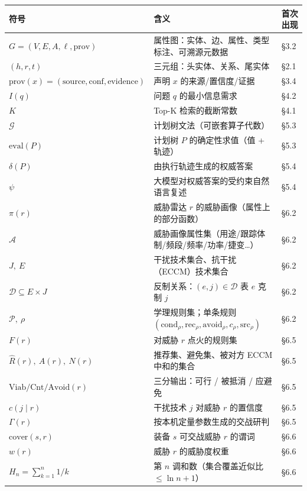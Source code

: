 \documentclass[12pt,a4paper]{ctexart}
\begin{document}
\begin{center}\small
\begin{tabular}{|p{}|p{}|p{}|}
\hline
\textbf{符号} & \textbf{含义} & \textbf{首次出现} \\ \hline
$G=(V,E,A,\ell,\mathrm{prov})$ & 属性图：实体、边、属性、类型标注、可溯源元数据 & §3.2 \\ \hline
$(h,r,t)$ & 三元组：头实体、关系、尾实体 & §2.1 \\ \hline
$\mathrm{prov}(x)=(\mathrm{source},\mathrm{conf},\mathrm{evidence})$ & 声明 $x$ 的来源/置信度/证据 & §3.4 \\ \hline
$I(q)$ & 问题 $q$ 的最小信息需求 & §4.2 \\ \hline
$K$ & Top-K 检索的截断常数 & §4.1 \\ \hline
$\mathcal{G}$ & 计划树文法（可嵌套算子代数） & §5.3 \\ \hline
$\mathrm{eval}(P)$ & 计划树 $P$ 的确定性求值（值 + 轨迹） & §5.3 \\ \hline
$\delta(P)$ & 由执行轨迹生成的权威答案 & §5.4 \\ \hline
$\psi$ & 大模型对权威答案的受约束自然语言复述 & §5.4 \\ \hline
$\pi(r)$ & 威胁雷达 $r$ 的威胁画像（属性上的部分函数） & §6.2 \\ \hline
$\mathcal{A}$ & 威胁画像属性集（用途/跟踪体制/频段/频率/功率/捷变…） & §6.2 \\ \hline
$J,\ E$ & 干扰技术集合、抗干扰（ECCM）技术集合 & §6.2 \\ \hline
$\mathcal{D}\subseteq E\times J$ & 反制关系：$(e,j)\in\mathcal{D}$ 表 $e$ 克制 $j$ & §6.2 \\ \hline
$\mathcal{P},\ \rho$ & 学理规则集；单条规则 $(\mathrm{cond}_\rho,\mathrm{rec}_\rho,\mathrm{avoid}_\rho,c_\rho,\mathrm{src}_\rho)$ & §6.2 \\ \hline
$F(r)$ & 对威胁 $r$ 点火的规则集 & §6.5 \\ \hline
$\widehat{R}(r),\ A(r),\ N(r)$ & 推荐集、避免集、被对方 ECCM 中和的集合 & §6.5 \\ \hline
$\mathrm{Viab}/\mathrm{Cnt}/\mathrm{Avoid}(r)$ & 三分输出：可行 / 被抵消 / 应避免 & §6.5 \\ \hline
$c(j\mid r)$ & 干扰技术 $j$ 对威胁 $r$ 的置信度 & §6.5 \\ \hline
$\Gamma(r)$ & 按本机定量参数生成的交战研判 & §6.5 \\ \hline
$\mathrm{cover}(s,r)$ & 装备 $s$ 可交战威胁 $r$ 的谓词 & §6.6 \\ \hline
$w(r)$ & 威胁 $r$ 的威胁度权重 & §6.6 \\ \hline
$H_n=\sum_{k=1}^n 1/k$ & 第 $n$ 调和数（集合覆盖近似比 $\le\ln n+1$） & §6.6 \\ \hline
\end{tabular}
\end{center}
\end{document}
